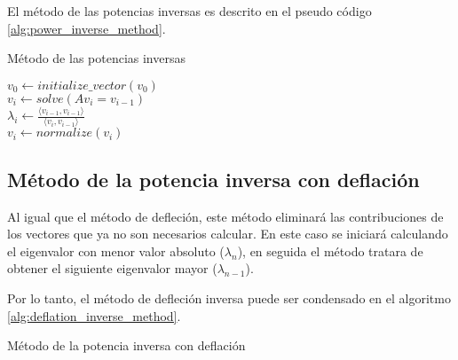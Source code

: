 El método de las potencias inversas es descrito en el pseudo código \ref{alg:power_inverse_method}.

\begin{algorithm}[H]
    \caption{Método de las potencias inversas}
    \label{alg:power_inverse_method}
    $v_0 \gets initialize\_vector(v_0)$ \\
    {
    $v_i \gets solve(Av_{i}=v_{i-1})$\\
    $\lambda_i \gets \frac{\langle v_{i-1} , v_{i-1}\rangle}{\langle v_{i}, v_{i-1}\rangle}$\\
    $v_i \gets normalize(v_i)$\\
    }
\end{algorithm}

\subsection{Método de la potencia inversa con deflación}

Al igual que el método de defleción, este método eliminará las contribuciones de los vectores que ya no son necesarios calcular. En este caso se iniciará calculando el eigenvalor con menor valor absoluto ($\lambda_n$), en seguida el método tratara de obtener el siguiente eigenvalor mayor ($\lambda_{n-1}$).

Por lo tanto, el método de defleción inversa puede ser condensado en el algoritmo \ref{alg:deflation_inverse_method}.

\begin{algorithm}[H]
    \caption{Método de la potencia inversa con deflación}
    \label{alg:deflation_inverse_method}
\end{algorithm}